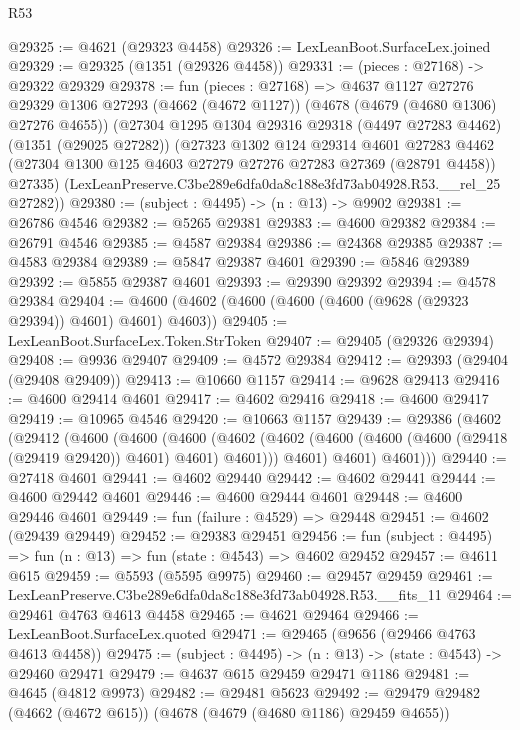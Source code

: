 \begin{lexlean}{R53}
\begin{coremodule}
@29325 := @4621 (@29323 @4458)
@29326 := LexLeanBoot.SurfaceLex.joined
@29329 := @29325 (@1351 (@29326 @4458))
@29331 := (pieces : @27168) -> @29322 @29329
@29378 := fun (pieces : @27168) =>
  @4637
    @1127
    @27276
    @29329
    @1306
    @27293
    (@4662 (@4672 @1127))
    (@4678 (@4679 (@4680 @1306) @27276 @4655))
    (@27304
      @1295
      @1304
      @29316
      @29318
      (@4497 @27283 @4462)
      (@1351 (@29025 @27282))
      (@27323
        @1302
        @124
        @29314
        @4601
        @27283
        @4462
        (@27304 @1300 @125 @4603 @27279 @27276 @27283 @27369 (@28791 @4458))
        @27335)
      (LexLeanPreserve.C3be289e6dfa0da8c188e3fd73ab04928.R53.__rel_25 @27282))
@29380 := (subject : @4495) -> (n : @13) -> @9902
@29381 := @26786 @4546
@29382 := @5265 @29381
@29383 := @4600 @29382
@29384 := @26791 @4546
@29385 := @4587 @29384
@29386 := @24368 @29385
@29387 := @4583 @29384
@29389 := @5847 @29387 @4601
@29390 := @5846 @29389
@29392 := @5855 @29387 @4601
@29393 := @29390 @29392
@29394 := @4578 @29384
@29404 := @4600 (@4602 (@4600 (@4600 (@4600 (@9628 (@29323 @29394)) @4601) @4601) @4603))
@29405 := LexLeanBoot.SurfaceLex.Token.StrToken
@29407 := @29405 (@29326 @29394)
@29408 := @9936 @29407
@29409 := @4572 @29384
@29412 := @29393 (@29404 (@29408 @29409))
@29413 := @10660 @1157
@29414 := @9628 @29413
@29416 := @4600 @29414 @4601
@29417 := @4602 @29416
@29418 := @4600 @29417
@29419 := @10965 @4546
@29420 := @10663 @1157
@29439 := @29386
    (@4602
      (@29412
        (@4600
          (@4600
            (@4600
              (@4602 (@4602 (@4600 (@4600 (@4600 (@29418 (@29419 @29420)) @4601) @4601) @4601)))
              @4601)
            @4601)
          @4601)))
@29440 := @27418 @4601
@29441 := @4602 @29440
@29442 := @4602 @29441
@29444 := @4600 @29442 @4601
@29446 := @4600 @29444 @4601
@29448 := @4600 @29446 @4601
@29449 := fun (failure : @4529) => @29448
@29451 := @4602 (@29439 @29449)
@29452 := @29383 @29451
@29456 := fun (subject : @4495) => fun (n : @13) => fun (state : @4543) => @4602 @29452
@29457 := @4611 @615
@29459 := @5593 (@5595 @9975)
@29460 := @29457 @29459
@29461 := LexLeanPreserve.C3be289e6dfa0da8c188e3fd73ab04928.R53.__fits_11
@29464 := @29461 @4763 @4613 @4458
@29465 := @4621 @29464
@29466 := LexLeanBoot.SurfaceLex.quoted
@29471 := @29465 (@9656 (@29466 @4763 @4613 @4458))
@29475 := (subject : @4495) -> (n : @13) -> (state : @4543) -> @29460 @29471
@29479 := @4637 @615 @29459 @29471 @1186
@29481 := @4645 (@4812 @9973)
@29482 := @29481 @5623
@29492 := @29479 @29482 (@4662 (@4672 @615)) (@4678 (@4679 (@4680 @1186) @29459 @4655))

\end{coremodule}
\end{lexlean}
